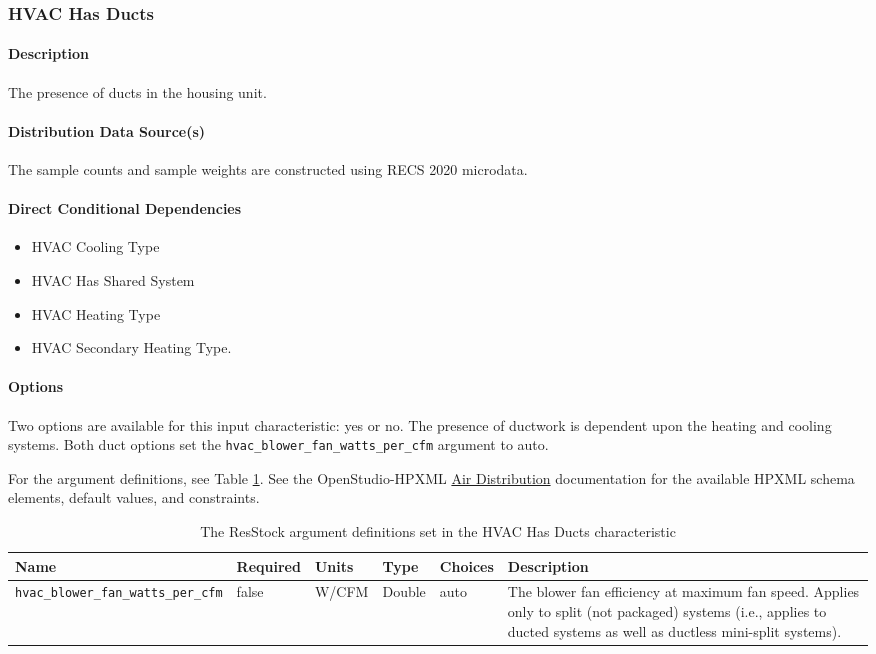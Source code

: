 \subsubsection{HVAC Has Ducts}

\paragraph{Description}
The presence of ducts in the housing unit.
\paragraph{Distribution Data Source(s)}
The sample counts and sample weights are constructed using RECS 2020 microdata.
\paragraph{Direct Conditional Dependencies}
\begin{itemize}
    \item HVAC Cooling Type
    \item HVAC Has Shared System
    \item HVAC Heating Type
    \item HVAC Secondary Heating Type.
\end{itemize}


\paragraph{Options}
Two options are available for this input characteristic: yes or no. The presence of ductwork is dependent upon the heating and cooling systems. Both duct options set the \texttt{hvac\_blower\_fan\_watts\_per\_cfm} argument to auto.

For the argument definitions, see Table \ref{table:hc_arg_def_hvac_has_duct}. See the OpenStudio-HPXML \href{https://openstudio-hpxml.readthedocs.io/en/v1.8.1/workflow_inputs.html#air-distribution}{Air Distribution} documentation for the available HPXML schema elements, default values, and constraints.

\begin{longtable}[]{|p{3.5cm}|p{1.5cm}|p{1.3cm}|p{1.1cm}|p{}|p{3.3cm}|}\caption{The ResStock argument definitions set in the HVAC Has Ducts characteristic} \label{table:hc_arg_def_hvac_has_duct} \\
\toprule\noalign{}
Name & Required & Units & Type & Choices & Description \\
\midrule\noalign{}
\endhead
\bottomrule\noalign{}
\endlastfoot
\texttt{hvac\_blower\_fan\_watts\_per\_cfm} & false & W/CFM & Double &
auto & The blower fan efficiency at maximum fan speed. Applies only to
split (not packaged) systems (i.e., applies to ducted systems as well as
ductless mini-split systems). \\
\end{longtable}
